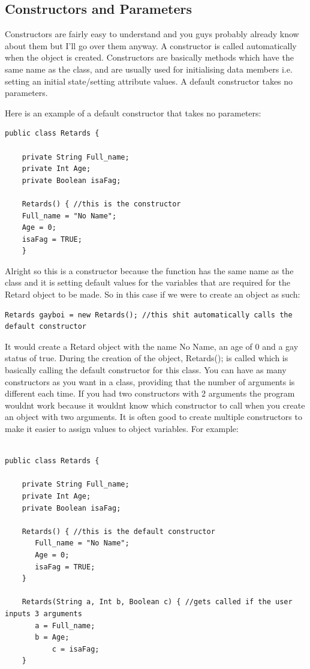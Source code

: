 \documentclass{article}
\begin{document}
\subsection{Constructors and Parameters}

Constructors are fairly easy to understand and you guys probably already know about them but I'll go over 
them anyway. A constructor is called automatically when the object is created. Constructors are basically
methods which have the same name as the class, and are usually used for initialising data members
i.e. setting an initial state/setting attribute values. A default constructor takes no parameters.

Here is an example of a default constructor that takes no parameters:

\begin{lstlisting}
public class Retards {

	private String Full_name;
	private Int Age;
	private Boolean isaFag;

	Retards() { //this is the constructor
	Full_name = "No Name";
	Age = 0;
	isaFag = TRUE;
	}
\end{lstlisting}
Alright so this is a constructor because the function has the same name as the class and it is setting
default values for the variables that are required for the Retard object to be made. So in this case
if we were to create an object as such:

\begin{lstlisting}
Retards gayboi = new Retards(); //this shit automatically calls the default constructor
\end{lstlisting}

It would create a Retard object with the name No Name, an age of 0 and a gay status of true. 
During the creation of the object, Retards(); is called which is basically calling the default
constructor for this class. You can have as many constructors as you want in a class, providing 
that the number of arguments is different each time. If you had two constructors with 2 arguments
the program wouldnt work because it wouldnt know which constructor to call when you create an 
object with two arguments. It is often good to create multiple constructors to make it easier
to assign values to object variables. For example:

\begin{lstlisting}

public class Retards {

	private String Full_name;
	private Int Age;
	private Boolean isaFag;

	Retards() { //this is the default constructor
	   Full_name = "No Name";
	   Age = 0;
	   isaFag = TRUE;
	}
	
	Retards(String a, Int b, Boolean c) { //gets called if the user inputs 3 arguments
	   a = Full_name;
	   b = Age;
           c = isaFag;
	}
\end{lstlisting}
\end{document}
